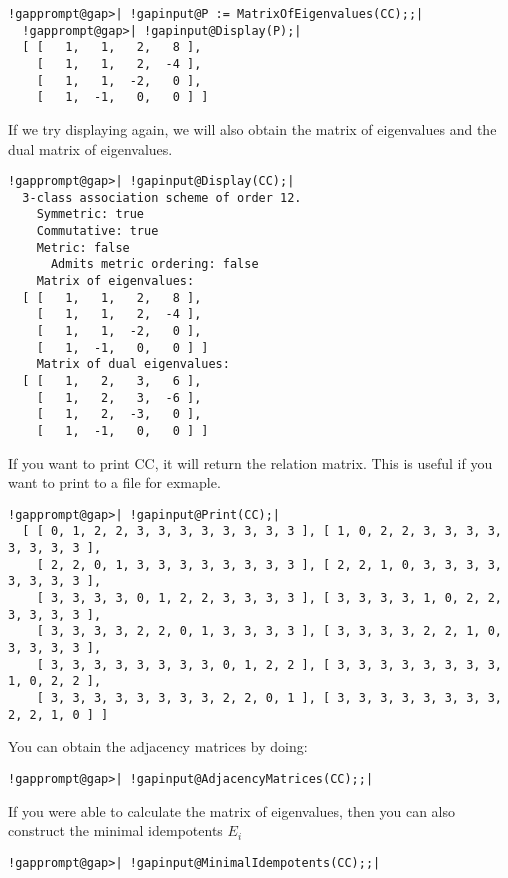 \documentclass[a4paper,11pt]{report}
\begin{document}
{{\begin{Verbatim}[commandchars=!@|,fontsize=\small,frame=single,label=Example]
  !gapprompt@gap>| !gapinput@P := MatrixOfEigenvalues(CC);;|
  !gapprompt@gap>| !gapinput@Display(P);|
  [ [   1,   1,   2,   8 ],
    [   1,   1,   2,  -4 ],
    [   1,   1,  -2,   0 ],
    [   1,  -1,   0,   0 ] ]
\end{Verbatim}
 If we try displaying again, we will also obtain the matrix of eigenvalues and
the dual matrix of eigenvalues. 
\begin{Verbatim}[commandchars=!@|,fontsize=\small,frame=single,label=Example]
  !gapprompt@gap>| !gapinput@Display(CC);|
  3-class association scheme of order 12.
    Symmetric: true
    Commutative: true
    Metric: false
      Admits metric ordering: false
    Matrix of eigenvalues:
  [ [   1,   1,   2,   8 ],
    [   1,   1,   2,  -4 ],
    [   1,   1,  -2,   0 ],
    [   1,  -1,   0,   0 ] ]
    Matrix of dual eigenvalues:
  [ [   1,   2,   3,   6 ],
    [   1,   2,   3,  -6 ],
    [   1,   2,  -3,   0 ],
    [   1,  -1,   0,   0 ] ]
\end{Verbatim}
 If you want to print CC, it will return the relation matrix. This is useful if
you want to print to a file for exmaple. 
\begin{Verbatim}[commandchars=!@|,fontsize=\small,frame=single,label=Example]
  !gapprompt@gap>| !gapinput@Print(CC);|
  [ [ 0, 1, 2, 2, 3, 3, 3, 3, 3, 3, 3, 3 ], [ 1, 0, 2, 2, 3, 3, 3, 3, 3, 3, 3, 3 ], 
    [ 2, 2, 0, 1, 3, 3, 3, 3, 3, 3, 3, 3 ], [ 2, 2, 1, 0, 3, 3, 3, 3, 3, 3, 3, 3 ], 
    [ 3, 3, 3, 3, 0, 1, 2, 2, 3, 3, 3, 3 ], [ 3, 3, 3, 3, 1, 0, 2, 2, 3, 3, 3, 3 ], 
    [ 3, 3, 3, 3, 2, 2, 0, 1, 3, 3, 3, 3 ], [ 3, 3, 3, 3, 2, 2, 1, 0, 3, 3, 3, 3 ], 
    [ 3, 3, 3, 3, 3, 3, 3, 3, 0, 1, 2, 2 ], [ 3, 3, 3, 3, 3, 3, 3, 3, 1, 0, 2, 2 ], 
    [ 3, 3, 3, 3, 3, 3, 3, 3, 2, 2, 0, 1 ], [ 3, 3, 3, 3, 3, 3, 3, 3, 2, 2, 1, 0 ] ]
\end{Verbatim}
 You can obtain the adjacency matrices by doing: 
\begin{Verbatim}[commandchars=!@|,fontsize=\small,frame=single,label=Example]
  !gapprompt@gap>| !gapinput@AdjacencyMatrices(CC);;|
\end{Verbatim}
 If you were able to calculate the matrix of eigenvalues, then you can also
construct the minimal idempotents $E_i$ 
\begin{Verbatim}[commandchars=!@|,fontsize=\small,frame=single,label=Example]
  !gapprompt@gap>| !gapinput@MinimalIdempotents(CC);;|
\end{Verbatim}
}}
\end{document}

